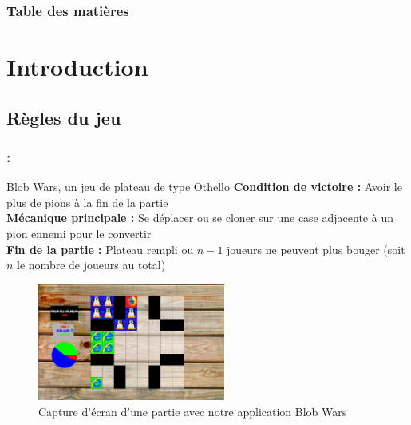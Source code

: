 \documentclass[9pt]{beamer}
\begin{document}
\begin{withoutheadline}
      
    \begin{frame}
        \frametitle{Table des matières}
        {\small \tableofcontents[]}
    \end{frame}

\end{withoutheadline}

\section{Introduction}

\subsection{Règles du jeu}

\begin{frame}[fragile]
\frametitle{\insertsectionhead : \insertsubsectionhead}

\begin{block}{Blob Wars, un jeu de plateau de type Othello}
\textbf{Condition de victoire :} Avoir le plus de pions à la fin de la partie\\
\textbf{Mécanique principale :} Se déplacer ou se cloner sur une case adjacente à un pion ennemi pour le convertir\\
\textbf{Fin de la partie :} Plateau rempli ou $n - 1$ joueurs ne peuvent plus bouger (soit $n$ le nombre de joueurs au total)
\end{block}

\begin{figure}[h]
\begin{center}
\includegraphics[width=0.55\textwidth]{captures/capturePartie.png}
\vspace{-5px}
\caption{Capture d'écran d'une partie avec notre application Blob Wars}
\end{center}
\end{figure}

\end{frame}
\end{document}
